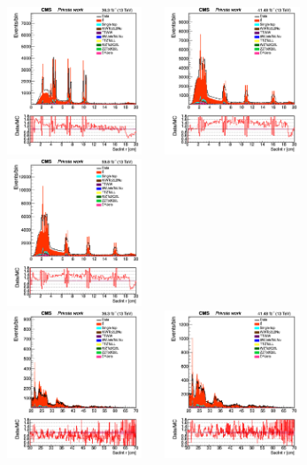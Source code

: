 \documentclass{cernatlasnote}
\begin{document}
\begin{figure}[htp]
\centering
\includegraphics[width=4.6cm, height=4.4cm] {images/emu_channel/2016/16_Plots_for_r_z/SecInt_r_Selec_eta_r_0_20_Linear.png}
\includegraphics[width=4.6cm, height=4.4cm]{images/emu_channel/2017/17_Plots_for_r_z/SecInt_r_Selec_eta_0_20_Linear.png}
 \includegraphics[width=4.6cm, height=4.4cm]{images/emu_channel/2018/18_Plots_for_r_z/SecInt_r_Selec_eta_r_0_20_Linear.png}\\
 \includegraphics[width=4.6cm, height=4.4cm]{images/emu_channel/2016/16_Plots_for_r_z/SecInt_r_Selec_eta_r_20_70_Linear.png}
\includegraphics[width=4.6cm, height=4.4cm]{images/emu_channel/2017/17_Plots_for_r_z/SecInt_r_Selec_eta_20_70_Linear.png}

\end{figure}
\end{document}
